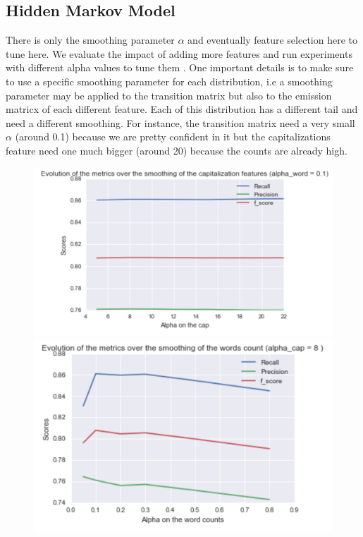 \documentclass[11pt]{article}
\begin{document}
\subsection{Hidden Markov Model}

There is only the smoothing parameter $\alpha$ and eventually feature selection here to tune here. We evaluate the impact of adding more features and run experiments with different alpha values to tune them . One important details is to make sure to use a specific smoothing parameter for each distribution, i.e a smoothing parameter may be applied to the transition matrix but also to the emission matricx of each different feature. Each of this distribution has a different tail and need a different smoothing. For instance, the transition matrix need a very small $\alpha$ (around 0.1) because we are pretty confident in it but the capitalizations feature need one much bigger (around 20) because the counts are already high.

\begin{figure}[H]
\centering
\begin{minipage}{.5\textwidth}
  \centering
  \includegraphics[width=1\linewidth]{cap_plot}
\end{minipage}%
\begin{minipage}{.5\textwidth}
  \centering
  \includegraphics[width=1\linewidth]{wc_plot}
\end{minipage}
\end{figure}
\end{document}
